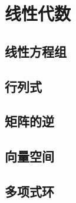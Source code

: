 \part{线性代数}
\begingroup
\def\x{\mat{X}}
\def\y{\mat{Y}}
\def\a{\mat{\alpha}}
\def\b{\mat{\beta}}
\def\e{\mat{\varepsilon}}
\def\g{\mat{\gamma}}
\def\X#1{\x_{#1}}
\def\A{\mat{A}}
\def\wA{\widetilde{\A}}
\def\B{\mat{B}}
\def\wB{\widetilde{\B}}
\def\C{\mat{C}}
\def\D{\mat{D}}
\def\P{\mat{P}}
\def\Q{\mat{Q}}
\def\l{\lambda}
\def\L#1{\l_{#1}}
\def\z{\mat{0}}
\def\E{\mat{E}}
\def\V{\mat{\Lambda}}


\chapter{线性方程组}











\chapter{行列式}







\chapter{矩阵的逆}





\chapter{向量空间}












\chapter{多项式环}


\endgroup
